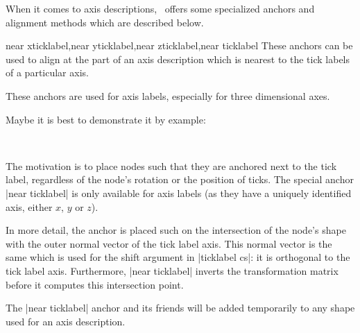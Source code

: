 When it comes to axis descriptions, \PGFPlots\ offers some specialized anchors and alignment methods which are described below.
\begin{anchorlist}{near xticklabel,near yticklabel,near zticklabel,near ticklabel}
	These anchors can be used to align at the part of an axis description which is nearest to the tick labels of a particular axis.

	These anchors are used for axis labels, especially for three dimensional axes.

	Maybe it is best to demonstrate it by example:
\begin{codeexample}[]
%
~
\end{codeexample}

	The motivation is to place nodes such that they are anchored next to the tick label, regardless of the node's rotation or the position of ticks. The special anchor |near ticklabel| is only available for axis labels (as they have a uniquely identified axis, either $x$, $y$ or $z$).

	In more detail, the anchor is placed such on the intersection of the node's shape with the outer normal vector of the tick label axis. This normal vector is the same which is used for the shift argument in |ticklabel cs|: it is orthogonal to the tick label axis. Furthermore, |near ticklabel| inverts the transformation matrix before it computes this intersection point.

	The |near ticklabel| anchor and its friends will be added temporarily to any shape used for an axis description.
\end{anchorlist}

